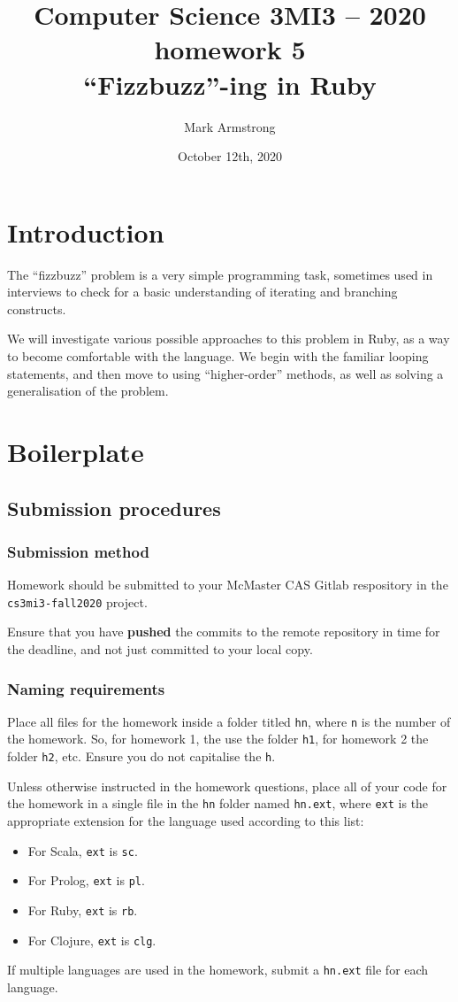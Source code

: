 \documentclass[11pt]{article}
\author{Mark Armstrong}
\date{October 12th, 2020}
\title{Computer Science 3MI3 – 2020 homework 5\\\medskip
\large “Fizzbuzz”-ing in Ruby}
\begin{document}
\maketitle
\tableofcontents


\section*{Introduction}
\label{sec:org89f6b8d}
The “fizzbuzz” problem is a very simple programming task,
sometimes used in interviews to check for a basic understanding
of iterating and branching constructs.

We will investigate various possible approaches to
this problem in Ruby, as a way to become comfortable
with the language.
We begin with the familiar looping statements,
and then move to using “higher-order” methods,
as well as solving a generalisation of the problem.

\section*{Boilerplate}
\label{sec:org4d758c0}
\subsection*{Submission procedures}
\label{sec:org1063a8f}
\subsubsection*{Submission method}
\label{sec:orgd39f7e8}

Homework should be submitted to your McMaster CAS Gitlab respository
in the \texttt{cs3mi3-fall2020} project.

Ensure that you have \textbf{pushed} the commits to the remote repository
in time for the deadline, and not just committed to your local copy.

\subsubsection*{Naming requirements}
\label{sec:org284620e}

Place all files for the homework
inside a folder titled \texttt{hn}, where \texttt{n} is the number of the homework.
So, for homework 1, the use the folder \texttt{h1}, for homework 2 the folder \texttt{h2}, etc.
Ensure you do not capitalise the \texttt{h}.

Unless otherwise instructed in the homework questions,
place all of your code for the homework
in a single file in the \texttt{hn} folder named \texttt{hn.ext},
where \texttt{ext} is the appropriate extension for the language used
according to this list:
\begin{itemize}
\item For Scala, \texttt{ext} is \texttt{sc}.
\item For Prolog, \texttt{ext} is \texttt{pl}.
\item For Ruby, \texttt{ext} is \texttt{rb}.
\item For Clojure, \texttt{ext} is \texttt{clg}.
\end{itemize}
If multiple languages are used in the homework,
submit a \texttt{hn.ext} file for each language.
\end{document}
